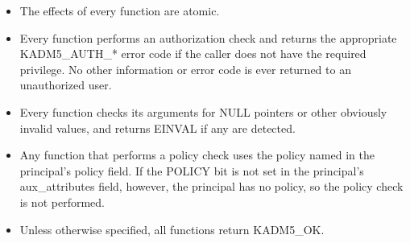 \begin{itemize}
\item The effects of every function are atomic.

\item Every function performs an authorization check and returns
the appropriate KADM5_AUTH_* error code if the caller does not
have the required privilege.  No other information or error code is
ever returned to an unauthorized user.

\item Every function checks its arguments for NULL pointers or other
obviously invalid values, and returns EINVAL if any are detected.

\item Any function that performs a policy check uses the policy named
in the principal's policy field.  If the POLICY bit is not set in the
principal's aux_attributes field, however, the principal has no
policy, so the policy check is not performed.

\item Unless otherwise specified, all functions return KADM5_OK.
\end{itemize}

